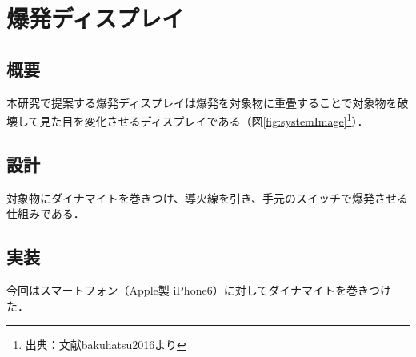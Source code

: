 \chapter{爆発ディスプレイ}
\label{chap:system}

\section{概要}

本研究で提案する爆発ディスプレイは爆発を対象物に重畳することで対象物を破壊して見た目を変化させるディスプレイである（図\ref{fig:systemImage}\footnote{出典：文献\cite{biblio}{bakuhatsu2016}より}）．



\section{設計}

対象物にダイナマイトを巻きつけ、導火線を引き、手元のスイッチで爆発させる仕組みである．

\section{実装}

今回はスマートフォン（Apple製 iPhone6）に対してダイナマイトを巻きつけた．